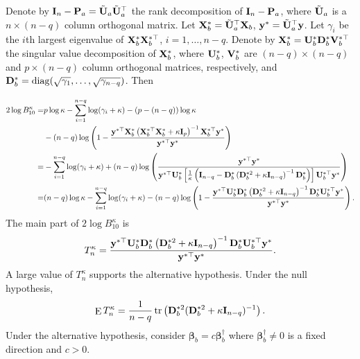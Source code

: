 \documentclass[11pt]{article}
\DeclareMathOperator{\mytr}{tr}
\DeclareMathOperator{\mydiag}{diag}
\DeclareMathOperator{\myE}{E}
\newcommand{\By}{\mathbf{y}}    \newcommand{\Bz}{\mathbf{z}}
\newcommand{\bfsym}[1]{\ensuremath{\boldsymbol{#1}}}
\def\bbeta{\bfsym \beta}
\theoremstyle{plain}
\theoremstyle{definition}
\theoremstyle{remark}
\begin{document}
Denote by $\mathbf{I}_n-\mathbf{P}_a=\tilde{\mathbf{U}}_a \tilde{\mathbf{U}}_a^\top$ the rank decomposition of $\mathbf{I}_n - \mathbf{P}_a$, where $\tilde{\mathbf{U}}_a$ is a $n\times (n-q)$ column orthogonal matrix.
Let $\mathbf{X}_b^* = \tilde{\mathbf{U}}_a^\top \mathbf{X}_b$, $\By^* =\tilde \BU_a^\top \By$.
Let $\gamma_i$ be the $i$th largest eigenvalue of $\mathbf{X}^*_b \mathbf{X}_b^{*\top}$, $i=1,\ldots, n-q$.
Denote by $\mathbf{X}_b^* =\mathbf{U}_{b}^* \mathbf{D}_{b}^* \mathbf{V}_b^{*\top}$ the singular value decomposition of $\mathbf{X}_{b}^*$, where  $\mathbf{U}_{b}^*$, $\mathbf{V}_b^*$ are $(n-q)\times (n-q)$ and $p\times (n-q)$ column orthogonal matrices, respectively, and $\BD_{b}^*=\mydiag (\sqrt {\gamma_1},\ldots, \sqrt{\gamma_{n-q}})$.
Then

\begin{equation*}
    \begin{split}
        2\log B_{10}^\kappa
        =&
         p\log \kappa
         - \sum_{i=1}^{n-q}\log ( \gamma_i + \kappa )
         -(p-(n-q))\log \kappa
         \\
         &-(n-q)\log\left(1-\frac{\By^{*\top} \BX_b^* \left( \BX_b^{*\top} \BX_b^* + \kappa \BI_p \right)^{-1} \BX_b^{*\top} \By^* }{\By^{*\top} \By^*}\right)
         \\
        =&
         - \sum_{i=1}^{n-q}\log ( \gamma_i + \kappa )
         +(n-q)\log\left(\frac{\By^{*\top} \By^*}{\By^{*\top} \BU_b^*  \left[\frac 1 \kappa \left(\BI_{n-q}-\BD_b^{*} \left(  \BD_b^{*2} + \kappa \BI_{n-q} \right)^{-1} \BD_b^{*} \right) \right] \BU_b^{*\top} \By^* }\right)
         \\
        =&
        (n-q)\log \kappa - \sum_{i=1}^{n-q}\log ( \gamma_i + \kappa )
         -(n-q)\log\left(1-\frac{\By^{*\top} \BU_b^*  \BD_b^{*} \left(  \BD_b^{*2} + \kappa \BI_{n-q} \right)^{-1} \BD_b^{*}   \BU_b^{*\top} \By^* }{\By^{*\top} \By^*}\right)
         .
    \end{split}
\end{equation*}
The main part of $2\log B_{10}^\kappa$ is 
\begin{equation*}
    T_n^\kappa = \frac{\By^{*\top} \BU_b^*  \BD_b^{*} \left(  \BD_b^{*2} + \kappa \BI_{n-q} \right)^{-1} \BD_b^{*}   \BU_b^{*\top} \By^* }{\By^{*\top} \By^*}.
\end{equation*}
A large value of $T_n^\kappa$ supports the alternative hypothesis.
Under the null hypothesis, 
\begin{equation*}
    \myE T_{n}^\kappa=
    \frac{1}{n-q} \mytr \left( \BD_b^{*2} ( \BD_b^{*2} + \kappa \BI_{n-q})^{-1}\right).
\end{equation*}
Under the alternative hypothesis, consider $\bbeta_b=c \bbeta_b^\dagger$ where $\bbeta_b^\dagger\neq 0$ is a fixed direction and $c>0$.
\end{document}
